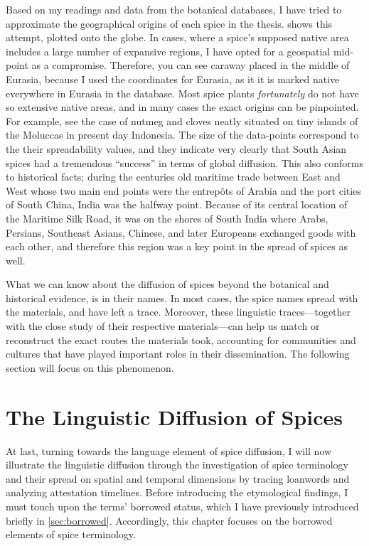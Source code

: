 Based on my readings and data from the botanical databases, I have tried to approximate the geographical origins of each spice in the thesis.  shows this attempt, plotted onto the globe. In cases, where a spice's supposed native area includes a large number of expansive regions, I have opted for a geospatial mid-point as a compromise. Therefore, you can see caraway placed in the middle of Eurasia, because I used the coordinates for Eurasia, as it it is marked native everywhere in Eurasia in the database. Most spice plants \textit{fortunately} do not have so extensive native areas, and in many cases the exact origins can be pinpointed. For example, see the case of nutmeg and cloves neatly situated on tiny islands of the Moluccas in present day Indonesia. %
The size of the data-points correspond to the their spreadability values, and they indicate very clearly that South Asian spices had a tremendous ``success'' in terms of global diffusion. This also conforms to historical facts; during the centuries old maritime trade between East and West whose two main end points were the entrepôts of Arabia and the port cities of South China, India was the halfway point. Because of its central location of the Maritime Silk Road, it was on the shores of South India where Arabs, Persians, Southeast Asians, Chinese, and later Europeans exchanged goods with each other, and therefore this region was a key point in the spread of spices as well.

What we can know about the diffusion of spices beyond the botanical and historical evidence, is in their names. In most cases, the spice names spread with the materials, and have left a trace. Moreover, these linguistic traces---together with the close study of their respective materials---can help us match or reconstruct the exact routes the materials took, accounting for communities and cultures that have played important roles in their dissemination. The following section will focus on this phenomenon.

\section{The Linguistic Diffusion of Spices}
\label{linguistic_diffusion}

At last, turning towards the language element of spice diffusion, I will now illustrate the linguistic diffusion through the investigation of spice terminology and their spread on spatial and temporal dimensions by tracing loanwords and analyzing attestation timelines. Before introducing the etymological findings, I must touch upon the terms' borrowed status, which I have previously introduced briefly in \cref{sec:borrowed}. Accordingly, this chapter focuses on the borrowed elements of spice terminology.

